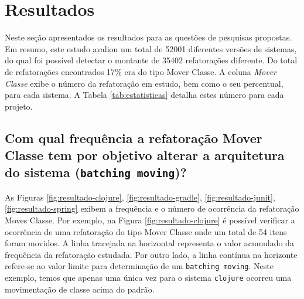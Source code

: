 \documentclass[12pt]{article}
\begin{document}


\section{Resultados}
\label{sec:resultados}

Neste seção apresentados os resultados para as questões de pesquisas propostas. Em resumo, este estudo avaliou um total de 52001 diferentes versões de sistemas, do qual foi possível detectar o montante de 35402 refatorações diferente. Do total de refatorações encontrados 17\% era do tipo Mover Classe. A coluna \textit{Mover Classe} exibe o número da refatoração em estudo, bem como o seu percentual, para cada sistema.  A Tabela \ref{tab:estatisticas} detalha estes número para cada projeto.


\begin{table}[htb]
	\centering
	\caption{Estatísticas dos Sistemas Analisados}
	\label{tab:estatisticas}
\end{table}

\subsection{Com qual frequência a refatoração Mover Classe tem por objetivo alterar a arquitetura do sistema (\texttt{batching moving})?}

As Figuras \ref{fig:resultado-clojure}, \ref{fig:resultado-gradle}, \ref{fig:resultado-junit}, \ref{fig:resultado-spring} exibem a frequência e o número de ocorrência da refatoração Moves Classe. Por exemplo, na Figura \ref{fig:resultado-clojure} é possível verificar a ocorrência de uma refatoração do tipo Mover Classe onde um total de 54 itens foram movidos. A linha tracejada na horizontal representa o valor acumulado da frequência da refatoração estudada. Por outro lado, a linha contínua na horizonte refere-se ao valor limite para determinação de um \texttt{batching moving}. Neste exemplo, temos que apenas uma única vez para o sistema \texttt{clojure} ocorreu uma movimentação de classe acima do padrão. 
\end{document}

